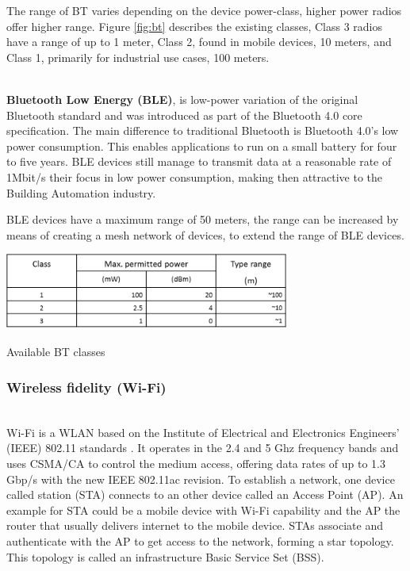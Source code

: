 The range of BT varies depending on the device power-class, higher power radios offer higher range. Figure \ref{fig:bt} describes the existing classes, Class 3 radios have a range of up to 1 meter, Class 2, found in mobile devices, 10 meters, and Class 1, primarily for industrial use cases, 100 meters.

\mbox{}\\
\textbf{Bluetooth Low Energy (BLE)}, is low-power variation of the original Bluetooth standard and was introduced as part of the Bluetooth 4.0 core specification. The main difference to traditional Bluetooth is Bluetooth 4.0's low power consumption. This enables applications to run on a small battery for four to five years. BLE devices still manage to transmit data at a reasonable rate of 1Mbit/s their focus in low power consumption, making then attractive to the Building Automation industry. 

BLE devices have a maximum range of 50 meters, the range can be increased by means of creating a mesh network of devices, to extend the range of BLE devices. 


\begin{table}[h]
\centering
\includegraphics[width=0.7\textwidth]{Figures/bt_tabela1}
\caption{Available BT classes}
\label{fig:bt}
\end{table}


\subsubsection{Wireless fidelity (Wi-Fi)}\mbox{}\\

Wi-Fi is a WLAN based on the Institute of Electrical and Electronics Engineers' (IEEE) 802.11 standards \cite{IEEE_wifi,std_802.11,report_802.11}. It operates in the 2.4 and 5 Ghz frequency bands and uses CSMA/CA to control the medium access, offering data rates of up to 1.3 Gbp/s with the new IEEE 802.11ac revision.
To establish a network, one device called station (STA) connects to an other device called an Access Point (AP). An example for STA could be  a mobile device with Wi-Fi capability and the AP the router that usually delivers internet to the mobile device.
STAs associate and authenticate with the AP to get access to the network, forming a star topology. This topology is called an infrastructure Basic Service Set (BSS).


